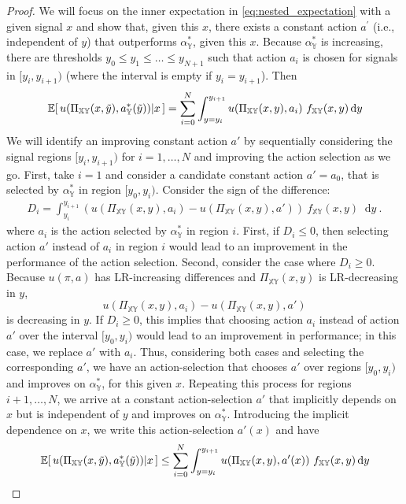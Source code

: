 \documentclass[11pt,onecolumn]{article}
\theoremstyle{plain}
\newcommand{\ev}[1]{\hspace{+0.20ex}\mathbb{E}\hspace{-0.40ex}\left[ \, #1 \, \right]}
\newcommand{\iY}[0]{{\mathbb{Y}}}
\newcommand{\iXY}[0]{{\mathbb{XY}}}
\newcommand\dif{\mathop{}\!\mathrm{d}}
\begin{document}
\begin{proof}
We will focus on the inner expectation in \eqref{eq:nested_expectation} with a given signal $x$ and show that, given this $x$, there exists a constant action $a^\prime$ (i.e., independent of $y$) that outperforms $\alpha_\iY^*$, given this $x$. Because $\alpha_\iY^*$ is increasing, there are thresholds $y_0 \leq y_1 \leq \ldots \leq y_{N+1}$ such that action $a_i$ is chosen for signals in $[y_i,y_{i+1})$ (where the interval is empty if $y_i = y_{i+1}$). Then
\begin{align}
     \ev{u(\Pi_\iXY(x,\tilde{y}),a_\iY^*(\tilde{y})) | x} = \sum_{i=0}^N\int_{y=y_{i}}^{y_{i+1}} u(\Pi_\iXY(x,y),a_i) \ f_\iXY(x,y) \dif y
\end{align}
We will identify an improving constant action $a'$ by sequentially considering the signal regions $[y_i,y_{i+1})$ for $i = 1, \ldots, N$ and improving the action selection as we go. First, take $i=1$ and consider a candidate constant action $a' = a_0$, that is selected by $\alpha_\iY^*$ in region $[y_0,y_i)$. Consider the sign of the difference:
\begin{eqnarray}
D_i = \int_{y_i}^{y_{i+1}} \left(u(\Pi_\iXY(x,y),a_i) - u(\Pi_\iXY(x,y),a')\right)  \ f_\iXY(x,y) \dif y \ .
\end{eqnarray}
where $a_i$ is the action selected by $\alpha_\iY^*$ in region $i$. First, if $D_i \leq 0$, then selecting action $a'$ instead of $a_i$ in region $i$ would lead to an improvement in the performance of the action selection.
Second, consider the case where $D_i \geq 0$. Because $u(\pi,a)$ has LR-increasing differences and $\Pi_\iXY(x, y)$ is LR-decreasing in $y$,
$$u(\Pi_\iXY(x,y),a_i) - u(\Pi_\iXY(x,y),a')$$
is decreasing in $y$.  If $D_i \geq 0$, this implies that choosing action $a_i$ instead of action $a'$ over the interval $[y_0,y_i)$ would lead to an improvement in performance; in this case, we replace $a'$ with $a_i$. Thus, considering both cases and selecting the corresponding $a'$, we have an action-selection that chooses $a'$ over regions $[y_0, y_i)$ and improves on $\alpha_\iY^*$, for this given $x$. Repeating this process for regions $i+1, \ldots, N$, we arrive at a constant action-selection $a'$ that implicitly depends on $x$ but is independent of $y$ and improves on $\alpha_\iY^*$. Introducing the implicit dependence on $x$, we write this action-selection $a'(x)$ and have
\begin{align}
     \ev{u(\Pi_\iXY(x,\tilde{y}),a_\iY^*(\tilde{y})) | x} &\leq  \sum_{i=0}^N\int_{y=y_{i}}^{y_{i+1}} u(\Pi_\iXY(x,y),a'(x)) \ f_\iXY(x,y) \dif y \\

\end{align}
\end{proof}
\end{document}
